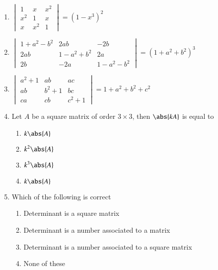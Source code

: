 \documentclass{article}
\theoremstyle{remark}
\begin{document}
\begin{enumerate}[resume]
\begin{enumerate}[label=(\roman*)]
\end{enumerate}
\item $\begin{vmatrix} 1&x&x^2\\ x^2&1&x\\ x&x^2&1 \end{vmatrix} = (1-x^3)^2$
\item $\begin{vmatrix} 1+a^2-b^2&2ab&-2b\\ 2ab&1-a^2+b^2&2a\\ 2b&-2a&1-a^2-b^2 \end{vmatrix} = (1+a^2+b^2)^3$
\item $\begin{vmatrix} a^2+1&ab&ac\\ ab&b^2+1&bc\\ ca&cb&c^2+1 \end{vmatrix} = 1+a^2+b^2+c^2$\label{prob:14}
\item Let $A$ be a square matrix of order $3 \times 3$, then $\abs{kA}$ is equal to 
\begin{enumerate}[label=(\roman*)]
\item $k \abs{A}$
\item $k^2 \abs{A}$
\item $k^3 \abs{A}$
\item $k \abs{A}$
\end{enumerate}
\item Which of the following is correct 
\begin{enumerate}
\item Determinant is a square matrix
\item Determinant is a number associated to a matrix
\item Determinant is a number associated to a square matrix
\item None of these
\end{enumerate}
\end{enumerate}
\end{document}
